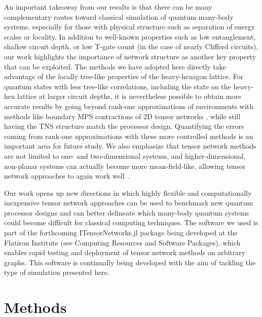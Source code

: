 \documentclass[%
 superscriptaddress,
 amsmath,amssymb,
 prx,
]{revtex4-2}
\newcommand{\mf}[1]{{\color{blue}{[MF: #1]}}}
\begin{document}
An important takeaway from our results is that there can be many complementary routes toward classical simulation of quantum many-body systems, especially for those with physical structure such as separation of energy scales or locality. In addition to well-known properties such as low entanglement, shallow circuit depth, or low T-gate count (in the case of nearly Clifford circuits), our work highlights the importance of network structure as another key property that can be exploited. The methods we have adopted here directly take advantage of the locally tree-like properties of the heavy-hexagon lattice. 
For quantum states with less tree-like correlations, including the state on the heavy-hex lattice at larger circuit depths, it is nevertheless possible to obtain more accurate results by going beyond rank-one approximations of environments with methods like boundary MPS contractions of 2D tensor networks \cite{Verstraete2004, Murg2007} \mf{Cite PEPS contraction and gauging papers by Lubasch et al. here.}, while still having the TNS structure match the processor design. Quantifying the errors coming from rank-one approximations with these more controlled methods is an important area for future study.  
We also emphasize that tensor network methods are not limited to one- and two-dimensional systems, and higher-dimensional, non-planar systems can actually become more mean-field-like, allowing tensor network approaches to again work well~\cite{tindall2022quantum, searle2023exact}. 

\par Our work opens up new directions in which highly flexible and computationally inexpensive tensor network approaches can be used to benchmark new quantum processor designs and can better delineate which many-body quantum systems could become difficult for classical computing techniques. The software we used is part of the forthcoming ITensorNetworks.jl package \cite{ITensorNetworks} being developed at the Flatiron Institute  (see Computing Resources and Software Packages), which enables rapid testing and deployment of tensor network methods on arbitrary graphs. This software is continually being developed with the aim of tackling the type of simulation presented here.  


\section*{Methods}
\label{sec:methods}
\end{document}
